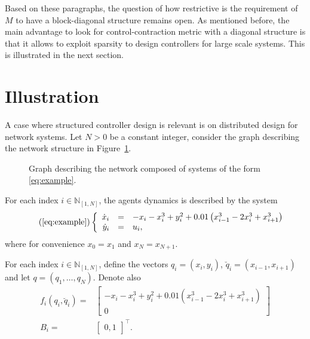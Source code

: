 \documentclass[10pt,twocolumn,twoside]{IEEEtran}
\theoremstyle{plain}
\theoremstyle{definition}
\theoremstyle{remark}
\begin{document}
Based on these paragraphs, the question of how restrictive is the requirement of $M$ to have a block-diagonal structure remains open. As mentioned before, the main advantage to look for control-contraction metric with a diagonal structure is that it allows to exploit sparsity to design controllers for large scale systems. This is illustrated in the next section.

\section{Illustration}\label{sec:Illustration}

A case where structured controller design is relevant is on distributed design for network systems. Let $N>0$ be a constant integer, consider the graph describing the network structure in Figure~\ref{fig:graph}.
\begin{figure}[htpb!]
	\centering
	
	\caption{Graph describing the network composed of systems of the form \eqref{eq:example}.}
	\label{fig:graph}
\end{figure}
For each index $i\in\mathbb{N}_{[1,N]}$, the agents dynamics is described by the system
\begin{equation}\tag{\ref{eq:example}}
	\left\{\begin{array}{rcl}
		\dot{x}_i&=&-x_i-x_i^3+y_i^2 + 0.01\left(x_{i-1}^3 - 2x_i^3 +x_{i+1}^3\right)\\
		\dot{y}_i&=&u_i,
	\end{array}\right.
\end{equation}
where for convenience $x_0=x_1$ and $x_N=x_{N+1}$.

For each index $i\in\mathbb{N}_{[1,N]}$, define the vectors $q_i=(x_i,y_i)$, $\breve{q}_i=(x_{i-1},x_{i+1})$ and let $q=(q_1,\ldots,q_N)$. Denote also
\begin{align*}
	f_i(q_i,\breve{q}_i)=&\begin{bmatrix}
		-x_i-x_i^3+y_i^2 + 0.01\left(x_{i-1}^3 - 2x_i^3 +x_{i+1}^3\right)\\
		0
	\end{bmatrix}\\
	B_i=&\begin{bmatrix}
	0, 1
	\end{bmatrix}^\top.
\end{align*}
\end{document}
